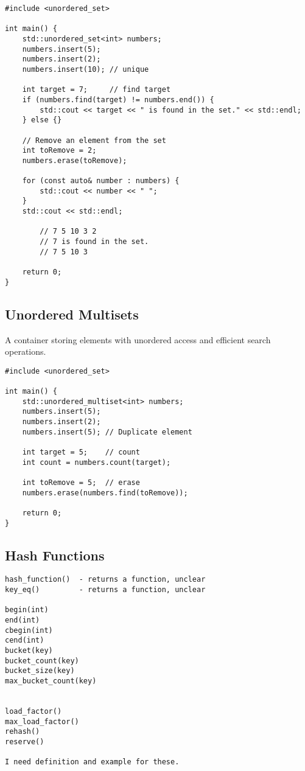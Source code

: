 \documentclass[openany]{report}
\begin{document}
\begin{verbatim}
#include <unordered_set>

int main() {
    std::unordered_set<int> numbers;
    numbers.insert(5);
    numbers.insert(2);
    numbers.insert(10); // unique

    int target = 7;     // find target
    if (numbers.find(target) != numbers.end()) {
        std::cout << target << " is found in the set." << std::endl;
    } else {}

    // Remove an element from the set
    int toRemove = 2;
    numbers.erase(toRemove);

    for (const auto& number : numbers) {
        std::cout << number << " ";
    }
    std::cout << std::endl;

        // 7 5 10 3 2
        // 7 is found in the set.
        // 7 5 10 3

    return 0;
}
\end{verbatim}

\subsection{Unordered Multisets}

A container storing elements with unordered access and efficient search operations.

\begin{verbatim}
#include <unordered_set>

int main() {
    std::unordered_multiset<int> numbers;
    numbers.insert(5);
    numbers.insert(2);
    numbers.insert(5); // Duplicate element

    int target = 5;    // count  
    int count = numbers.count(target); 

    int toRemove = 5;  // erase
    numbers.erase(numbers.find(toRemove));

    return 0;
}
\end{verbatim}

\subsection{Hash Functions}

\begin{verbatim}
hash_function()  - returns a function, unclear
key_eq()         - returns a function, unclear 

begin(int)
end(int)
cbegin(int)
cend(int)
bucket(key)
bucket_count(key)
bucket_size(key)
max_bucket_count(key)


load_factor()
max_load_factor()
rehash()
reserve()

I need definition and example for these.
\end{verbatim}
\end{document}
